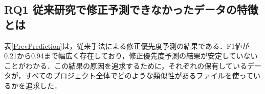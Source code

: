 \documentclass[T,J]{fose} %
\begin{document}
\subsection{RQ1 従来研究で修正予測できなかったデータの特徴とは}

表\ref{PrevPrediction}は，従来手法による修正優先度予測の結果である．F1値が0.21から0.94まで幅広く存在しており，修正優先度予測の結果が安定していないことがわかる．この結果の原因を追求するために，それぞれの保有しているデータが，すべてのプロジェクト全体でどのような類似性があるファイルを使っているかを追求した．
\end{document}
